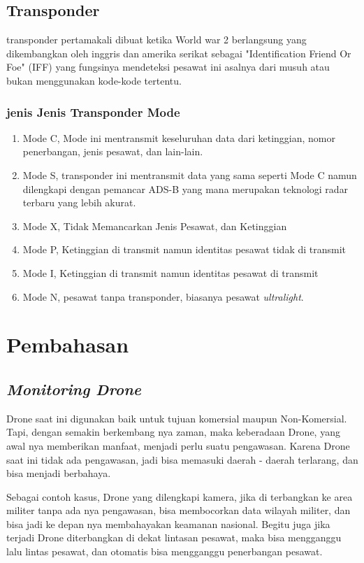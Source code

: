 \documentclass[9pt,twocolumn,twoside]{Gunadarma}
\begin{document}
\subsection{Transponder}

transponder pertamakali dibuat ketika World war 2 berlangsung yang dikembangkan oleh inggris dan amerika serikat sebagai "Identification Friend Or Foe" (IFF) yang fungsinya mendeteksi pesawat ini asalnya dari musuh atau bukan menggunakan kode-kode tertentu.

\subsubsection{jenis Jenis Transponder Mode}
\begin{enumerate}
	\item Mode C, Mode ini mentransmit keseluruhan data dari ketinggian, nomor penerbangan, jenis pesawat, dan lain-lain.
	\item Mode S, transponder ini mentransmit data yang sama seperti Mode C namun dilengkapi dengan pemancar ADS-B yang mana merupakan teknologi radar terbaru yang lebih akurat.
	\item Mode X, Tidak Memancarkan Jenis Pesawat, dan Ketinggian
	\item Mode P, Ketinggian di transmit namun identitas pesawat tidak di transmit
	\item Mode I, Ketinggian di transmit namun identitas pesawat di transmit
	\item Mode N, pesawat tanpa transponder, biasanya pesawat \textit{ultralight}.
\end{enumerate}


\section{Pembahasan}

\subsection{\textit{Monitoring Drone}}

Drone saat ini digunakan baik untuk tujuan komersial maupun Non-Komersial. Tapi, dengan semakin berkembang nya zaman, maka keberadaan Drone, yang awal nya memberikan manfaat, menjadi perlu suatu pengawasan. Karena Drone saat ini tidak ada pengawasan, jadi bisa memasuki daerah - daerah terlarang, dan bisa menjadi berbahaya. 

Sebagai contoh kasus, Drone yang dilengkapi kamera, jika di terbangkan ke area militer tanpa ada nya pengawasan, bisa membocorkan data wilayah militer, dan bisa jadi ke depan nya membahayakan keamanan nasional. Begitu juga jika terjadi Drone diterbangkan di dekat lintasan pesawat, maka bisa mengganggu lalu lintas pesawat, dan otomatis bisa mengganggu penerbangan pesawat. 
\end{document}
